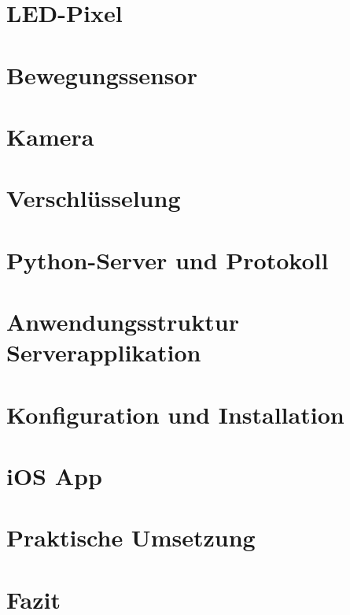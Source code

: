 


\begin{titlepage}



\end{titlepage}

\thispagestyle{empty} %
\tableofcontents
\thispagestyle{empty}  
\pagebreak


\section{LED-Pixel} 
\section{Bewegungssensor} 
\section{Kamera}
\section{Verschlüsselung}
\section{Python-Server und Protokoll} 
\section{Anwendungsstruktur Serverapplikation}
\section{Konfiguration und Installation}
\section{iOS App}
\section{Praktische Umsetzung}
\section{Fazit}



 

 
